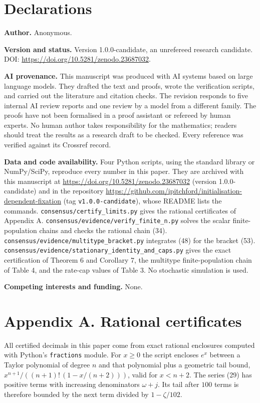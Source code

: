 \documentclass[
  british,
  11pt,
  a4paper,
]{article}
\begin{document}
\section{Declarations}\label{declarations}

\textbf{Author.} Anonymous.

\textbf{Version and status.} Version 1.0.0-candidate, an unrefereed
research candidate. DOI: \url{https://doi.org/10.5281/zenodo.23687032}.

\textbf{AI provenance.} This manuscript was produced with AI systems
based on large language models. They drafted the text and proofs, wrote
the verification scripts, and carried out the literature and citation
checks. The revision responds to five internal AI review reports and one
review by a model from a different family. The proofs have not been
formalised in a proof assistant or refereed by human experts. No human
author takes responsibility for the mathematics; readers should treat
the results as a research draft to be checked. Every reference was
verified against its Crossref record.

\textbf{Data and code availability.} Four Python scripts, using the
standard library or NumPy/SciPy, reproduce every number in this paper.
They are archived with this manuscript at
\url{https://doi.org/10.5281/zenodo.23687032} (version 1.0.0-candidate)
and in the repository
\url{https://github.com/ipitchford/initialisation-dependent-fixation}
(tag \texttt{v1.0.0-candidate}), whose README lists the commands.
\texttt{consensus/certify\_limits.py} gives the rational certificates of
Appendix A. \texttt{consensus/evidence/verify\_finite\_n.py} solves the
scalar finite-population chains and checks the rational chain (34).
\texttt{consensus/evidence/multitype\_bracket.py} integrates (48) for
the bracket (53).
\texttt{consensus/evidence/stationary\_identity\_and\_caps.py} gives the
exact certification of Theorem 6 and Corollary 7, the multitype
finite-population chain of Table 4, and the rate-cap values of Table 3.
No stochastic simulation is used.

\textbf{Competing interests and funding.} None.

\section{Appendix A. Rational
certificates}\label{appendix-a.-rational-certificates}

All certified decimals in this paper come from exact rational enclosures
computed with Python's \texttt{fractions} module. For \(x\ge0\) the
script encloses \(e^x\) between a Taylor polynomial of degree \(n\) and
that polynomial plus a geometric tail bound,
\(x^{n+1}/((n+1)!\,(1-x/(n+2)))\), valid for \(x<n+2\). The series (29)
has positive terms with increasing denominators \(\omega+j\). Its tail
after \(100\) terms is therefore bounded by the next term divided by
\(1-\zeta/102\).
\end{document}

